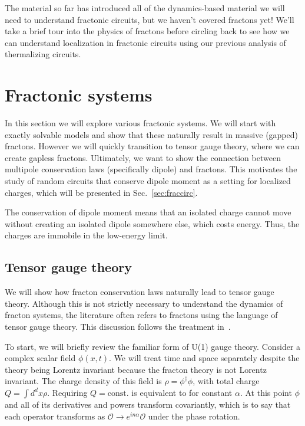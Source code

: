 \documentclass[a4paper,12pt]{article}
\newcommand{\note}[1]{{\color{red}{#1}}}
\begin{document}
The material so far has introduced all of the dynamics-based material we will need to understand fractonic circuits, but we haven't covered fractons yet! We'll take a brief tour into the physics of fractons before circling back to see how we can understand localization in fractonic circuits using our previous analysis of thermalizing circuits.


\section{Fractonic systems} \label{sec:frac}

In this section we will explore various fractonic systems. We will start with exactly solvable models and show that these naturally result in massive (gapped) fractons. However we will quickly transition to tensor gauge theory, where we can create gapless fractons. Ultimately, we want to show the connection between multipole conservation laws (specifically dipole) and fractons. This motivates the study of random circuits that conserve dipole moment as a setting for localized charges, which will be presented in Sec.~\ref{sec:fraccirc}.

The conservation of dipole moment means that an isolated charge cannot move without creating an isolated dipole somewhere else, which costs energy. Thus, the charges are immobile in the low-energy limit. 

\subsection{Tensor gauge theory} \label{sub:tensor}

We will show how fracton conservation laws naturally lead to tensor gauge theory. Although this is not strictly necessary to understand the dynamics of fracton systems, the literature often refers to fractons using the language of tensor gauge theory. This discussion follows the treatment in~\cite{PretkoFractonGauge}. 

To start, we will briefly review the familiar form of U(1) gauge theory. Consider a complex scalar field $\phi(x,t)$. We will treat time and space separately despite the theory being Lorentz invariant because the fracton theory is not Lorentz invariant. The charge density of this field is $\rho =\phi^\dag\phi$, with total charge $Q=\int d^dx \rho$. Requiring $Q=\text{const.}$ is equivalent to \note{requiring
\begin{align}
\phi\to e^{i\alpha}\phi
\end{align}	
be a symmetry of the theory,} for constant $\alpha$. At this point $\phi$ and all of its derivatives and powers transform covariantly, which is to say that each operator transforms as $\mathcal{O}\to e^{in\alpha}\mathcal{O}$ under the phase rotation.
\end{document}
